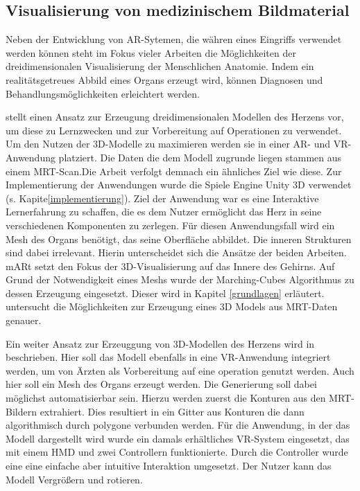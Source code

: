 \subsection{Visualisierung von medizinischem Bildmaterial}

Neben der Entwicklung von AR-Sytemen, die währen eines Eingriffs verwendet werden können steht im Fokus vieler Arbeiten die Möglichkeiten der dreidimensionalen Visualisierung der Menschlichen Anatomie. Indem ein realitätsgetreues Abbild eines Organs erzeugt wird, können Diagnosen und Behandlungsmöglichkeiten erleichtert werden.

\cite{Mangina17} stellt einen Ansatz zur Erzeugung dreidimensionalen Modellen des Herzens vor, um diese zu Lernzwecken und zur Vorbereitung auf Operationen zu verwendet. Um den Nutzen der 3D-Modelle zu maximieren werden sie in einer AR- und VR-Anwendung platziert. Die Daten die dem Modell zugrunde liegen stammen aus einem MRT-Scan.Die Arbeit verfolgt demnach ein ähnliches Ziel wie diese. 
Zur Implementierung der Anwendungen wurde die Spiele Engine Unity 3D verwendet (s. Kapite\ref{implementierung}).
Ziel der Anwendung war es eine Interaktive Lernerfahrung zu schaffen, die es dem Nutzer ermöglicht das Herz in seine verschiedenen Komponenten zu zerlegen. Für diesen Anwendungsfall wird ein Mesh des Organs benötigt, das seine Oberfläche abbildet. Die inneren Strukturen sind dabei irrelevant. Hierin unterscheidet sich  die Ansätze der beiden Arbeiten. mARt setzt den Fokus der 3D-Visualisierung auf das Innere des Gehirns.
Auf Grund der Notwendigkeit eines Meshs wurde der Marching-Cubes Algorithmus zu dessen Erzeugung eingesetzt. Dieser wird in Kapitel \ref{grundlagen} erläutert.
\cite{Mangina17_2} untersucht die Möglichkeiten zur Erzeugung eines 3D Models aus MRT-Daten genauer.

Ein weiter Ansatz zur Erzeuggung von 3D-Modellen des Herzens wird in \cite{SORENSEN2001193} beschrieben. Hier soll das Modell ebenfalls in eine VR-Anwendung integriert werden, um von Ärzten als Vorbereitung auf eine operation genutzt werden. 
Auch hier soll ein Mesh des Organs erzeugt werden. Die Generierung soll dabei möglichst automatisierbar sein.  Hierzu werden zuerst die Konturen aus den MRT-Bildern extrahiert. Dies resultiert in ein Gitter aus Konturen die dann algorithmisch durch polygone verbunden werden. 
Für die Anwendung, in der das Modell dargestellt wird wurde ein damals erhältliches VR-System eingesetzt, das mit einem HMD und zwei Controllern funktionierte. 
Durch die Controller wurde eine eine einfache aber intuitive Interaktion umgesetzt. Der Nutzer kann das Modell Vergrößern und rotieren.  

